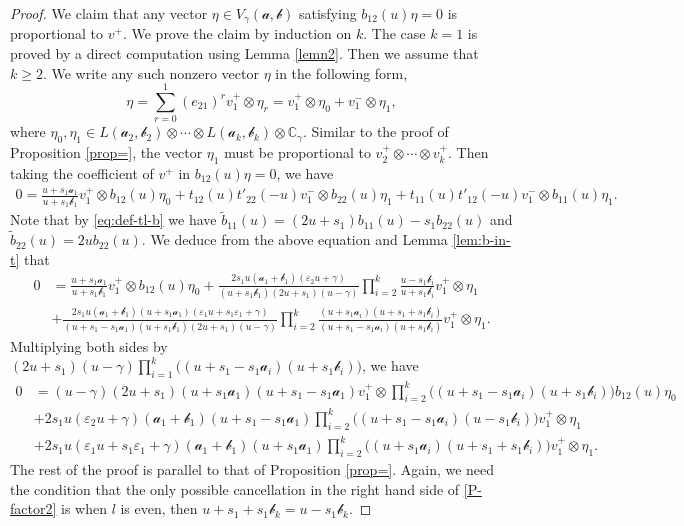 \documentclass[11pt,reqno]{amsart}
\numberwithin{equation}{section}
\theoremstyle{definition}
\theoremstyle{remark}
\newcommand{\mc}{\mathcal}
\newcommand{\bC}{\mathbb{C}}
\newcommand{\tl}{\tilde}
\newcommand{\gge}{\geqslant}
\newcommand{\ve}{\varepsilon}
\begin{document}
\begin{proof}
We claim that any vector $\eta\in V_{\gamma}(\bm{\mc a,\mc b})$ satisfying $b_{12}(u)\eta=0$ is proportional to $v^+$. We prove the claim by induction on $k$. The case $k=1$ is proved by a direct computation using Lemma \ref{lemn2}. Then we assume that $k\gge 2$. We write any such nonzero vector $\eta$ in the following form,
\[
\eta=\sum_{r=0}^1 (e_{21})^rv_1^+\otimes\eta_r=v_1^+\otimes \eta_0+v_1^-\otimes \eta_1,
\]
where $\eta_0,\eta_1\in L(\mc a_2,\mc b_2)\otimes \cdots\otimes L(\mc a_k,\mc b_k)\otimes\bC_\gamma$. Similar to the proof of Proposition \ref{prop=}, the vector $\eta_1$ must be proportional to $v_2^+\otimes\cdots\otimes v_k^+$. Then taking the coefficient of $v^+$ in $b_{12}(u)\eta=0$, we have
\begin{align*}
0=\frac{u+s_1\mc a_1}{u+s_1\mc b_1}v_1^+\otimes b_{12}(u)\eta_0+t_{12}(u)t'_{22}(-u)v_1^-\otimes b_{22}(u)\eta_1+t_{11}(u)t'_{12}(-u)v_1^-\otimes b_{11}(u)\eta_1.
\end{align*}
Note that by \eqref{eq:def-tl-b} we have $\tl b_{11}(u)=(2u+s_1)b_{11}(u)-s_1b_{22}(u)$ and $\tl b_{22}(u)=2ub_{22}(u)$. We deduce from the above equation and Lemma \ref{lem:b-in-t} that
\begin{align*}
0&=\frac{u+s_1\mc a_1}{u+s_1\mc b_1}v_1^+\otimes b_{12}(u)\eta_0+\frac{2s_1u(\mc a_1+\mc b_1)(\ve_2u+\gamma)}{(u+s_1\mc b_1)(2u+s_1)(u-\gamma)}\prod_{i=2}^k\frac{u-s_1\mc b_i}{u+s_1\mc b_i} v_1^+\otimes \eta_1 \\
&+\frac{2s_1u(\mc a_1+\mc b_1)(u+s_1\mc a_1)(\ve_1u+s_1\ve_1+\gamma)}{(u+s_1-s_1\mc a_1)(u+s_1\mc b_1)(2u+s_1)(u-\gamma)}\prod_{i=2}^k\frac{(u+s_1\mc a_i)(u+s_1+s_1\mc b_i)}{(u+s_1-s_1\mc a_i)(u+s_1\mc b_i)} v_1^+\otimes \eta_1.
\end{align*}
Multiplying both sides by $(2u+s_1)(u-\gamma)\prod_{i=1}^k\big((u+s_1-s_1\mc a_i)(u+s_1\mc b_i)\big)$, we have
\begin{align*}
0&=(u-\gamma)(2u+s_1)(u+s_1\mc a_1)(u+s_1-s_1\mc a_1)v_1^+\otimes \prod_{i=2}^k\big((u+s_1-s_1\mc a_i)(u+s_1\mc b_i)\big)b_{12}(u)\eta_0\\
&+2s_1u(\ve_2u+\gamma)(\mc a_1+\mc b_1)(u+s_1-s_1\mc a_1)\prod_{i=2}^k\big((u+s_1-s_1\mc a_i)(u-s_1\mc b_i)\big) v_1^+\otimes \eta_1 \\
&+2s_1u(\ve_1u+s_1\ve_1+\gamma)(\mc a_1+\mc b_1)(u+s_1\mc a_1)\prod_{i=2}^k\big((u+s_1\mc a_i)(u+s_1+s_1\mc b_i)\big) v_1^+\otimes \eta_1.
\end{align*}
The rest of the proof is parallel to that of Proposition \ref{prop=}. Again, we need the condition that the only possible cancellation in the right hand side of \eqref{P-factor2} is when $l$ is even, then $u+s_1+s_1\mc b_k=u-s_1\mc b_k$.
\end{proof}
\end{document}
